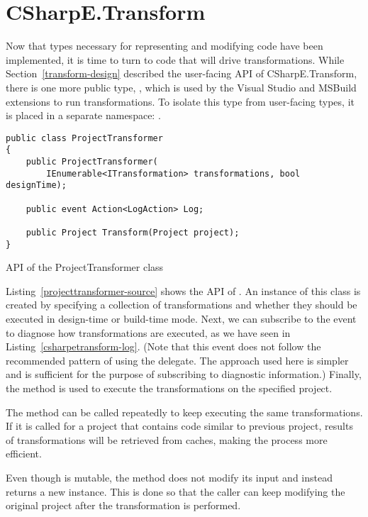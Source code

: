 \section{CSharpE.Transform}

Now that types necessary for representing and modifying code have been implemented, it is time to turn to code that will drive transformations. \label{ProjectTransformer} While Section~\ref{transform-design} described the user-facing \ac{API} of CSharpE.Transform, there is one more public type, , which is used by the Visual Studio and MSBuild extensions to run transformations. To isolate this type from user-facing types, it is placed in a separate namespace: .

\begin{listing}
\begin{verbatim}
public class ProjectTransformer
{
    public ProjectTransformer(
        IEnumerable<ITransformation> transformations, bool designTime);

    public event Action<LogAction> Log;

    public Project Transform(Project project);
}
\end{verbatim}
\caption{API of the ProjectTransformer class}
\label{projecttransformer-source}
\end{listing}

Listing~\ref{projecttransformer-source} shows the \ac{API} of . An instance of this class is created by specifying a collection of transformations and whether they should be executed in design-time or build-time mode. Next, we can subscribe to the  event to diagnose how transformations are executed, as we have seen in Listing~\ref{csharpetransform-log}. (Note that this event does not follow the recommended pattern of using the  delegate. \cite{fdg-events} The approach used here is simpler and is sufficient for the purpose of subscribing to diagnostic information.) Finally, the  method is used to execute the transformations on the specified project.

The  method can be called repeatedly to keep executing the same transformations. If it is called for a project that contains code similar to previous project, results of transformations will be retrieved from caches, making the process more efficient.

Even though  is mutable, the method does not modify its input and instead returns a new  instance. This is done so that the caller can keep modifying the original project after the transformation is performed.

